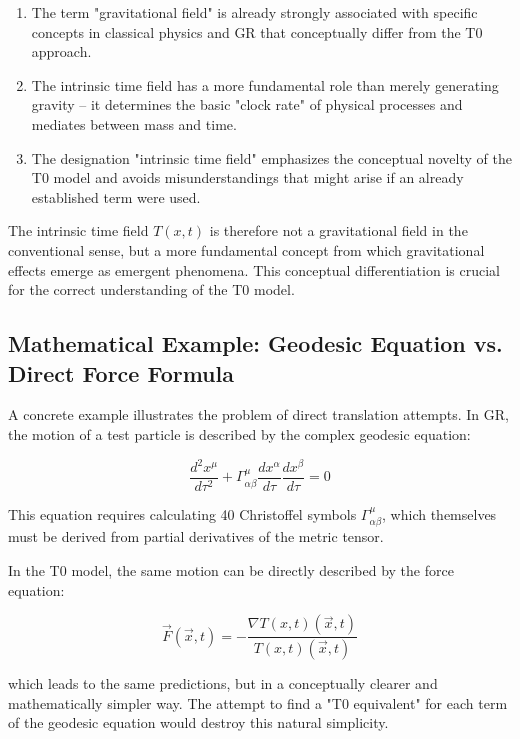 \documentclass[12pt,a4paper]{article}
\newcommand{\Tfieldt}{T(x,t)}
\newcommand{\vecx}{\vec{x}}
\begin{document}
	\begin{enumerate}
		\item The term "gravitational field" is already strongly associated with specific concepts in classical physics and GR that conceptually differ from the T0 approach.
		
		\item The intrinsic time field has a more fundamental role than merely generating gravity – it determines the basic "clock rate" of physical processes and mediates between mass and time.
		
		\item The designation "intrinsic time field" emphasizes the conceptual novelty of the T0 model and avoids misunderstandings that might arise if an already established term were used.
	\end{enumerate}
	
	The intrinsic time field $\Tfieldt$ is therefore not a gravitational field in the conventional sense, but a more fundamental concept from which gravitational effects emerge as emergent phenomena. This conceptual differentiation is crucial for the correct understanding of the T0 model.
	
	\subsection{Mathematical Example: Geodesic Equation vs. Direct Force Formula}
	\label{subsec:math_example}
	
	A concrete example illustrates the problem of direct translation attempts. In GR, the motion of a test particle is described by the complex geodesic equation:
	
	\begin{equation}
		\frac{d^2 x^\mu}{d\tau^2} + \Gamma^\mu_{\alpha\beta} \frac{dx^\alpha}{d\tau} \frac{dx^\beta}{d\tau} = 0
	\end{equation}
	
	This equation requires calculating 40 Christoffel symbols $\Gamma^\mu_{\alpha\beta}$, which themselves must be derived from partial derivatives of the metric tensor.
	
	In the T0 model, the same motion can be directly described by the force equation:
	
	\begin{equation}
		\vec{F}(\vecx,t) = -\frac{\nabla\Tfieldt(\vecx,t)}{\Tfieldt(\vecx,t)}
	\end{equation}
	
	which leads to the same predictions, but in a conceptually clearer and mathematically simpler way. The attempt to find a "T0 equivalent" for each term of the geodesic equation would destroy this natural simplicity.
	
\end{document}
